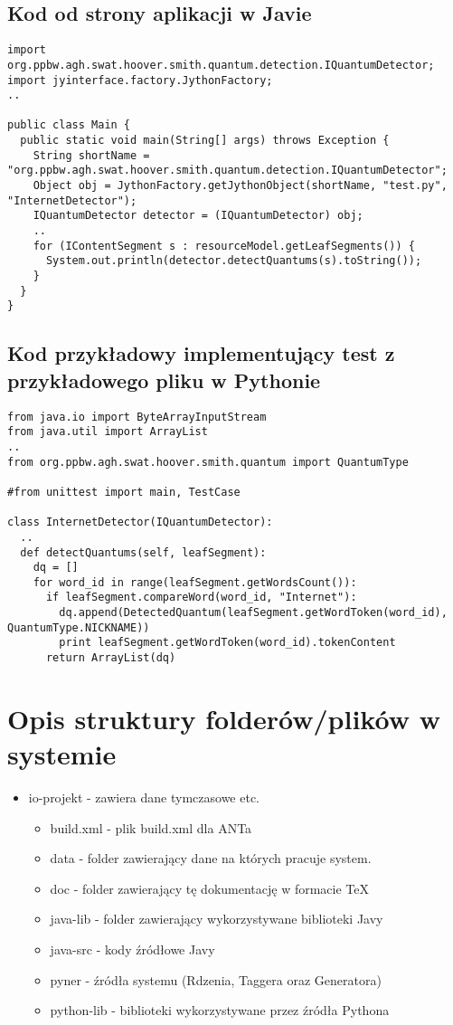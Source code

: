 \documentclass[12pt]{article}
\begin{document}
\subsection{Kod od strony aplikacji w Javie}
\begin{verbatim}
import org.ppbw.agh.swat.hoover.smith.quantum.detection.IQuantumDetector;
import jyinterface.factory.JythonFactory;
..

public class Main {
  public static void main(String[] args) throws Exception {
    String shortName = "org.ppbw.agh.swat.hoover.smith.quantum.detection.IQuantumDetector";
    Object obj = JythonFactory.getJythonObject(shortName, "test.py", "InternetDetector");
    IQuantumDetector detector = (IQuantumDetector) obj;
    ..
    for (IContentSegment s : resourceModel.getLeafSegments()) {
      System.out.println(detector.detectQuantums(s).toString());
    }
  }
}

\end{verbatim}

\subsection{Kod przykładowy implementujący test z przykładowego pliku w Pythonie}
\begin{verbatim}
from java.io import ByteArrayInputStream
from java.util import ArrayList
..
from org.ppbw.agh.swat.hoover.smith.quantum import QuantumType

#from unittest import main, TestCase

class InternetDetector(IQuantumDetector):
  ..
  def detectQuantums(self, leafSegment):
    dq = []
    for word_id in range(leafSegment.getWordsCount()):
      if leafSegment.compareWord(word_id, "Internet"):
        dq.append(DetectedQuantum(leafSegment.getWordToken(word_id), QuantumType.NICKNAME))
        print leafSegment.getWordToken(word_id).tokenContent
      return ArrayList(dq)

\end{verbatim}

\section{Opis struktury folderów/plików w systemie}
\begin{itemize}
\item io-projekt - zawiera dane tymczasowe etc.
\begin{itemize}
\item build.xml - plik build.xml dla ANTa
\item data - folder zawierający dane na których pracuje system.
\item doc - folder zawierający tę dokumentację w formacie TeX
\item java-lib - folder zawierający wykorzystywane biblioteki Javy
\item java-src - kody źródłowe Javy
\item pyner - źródła systemu (Rdzenia, Taggera oraz Generatora)
\item python-lib - biblioteki wykorzystywane przez źródła Pythona
\end{itemize}
\end{itemize}
\end{document}
